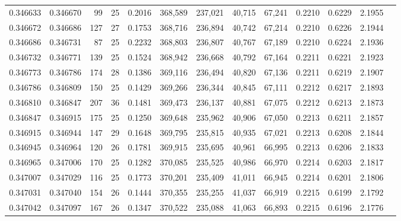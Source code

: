 \begin{tabular}{rrrrrrrrrrrrr}
0.346633 & 0.346670 &    99 &  25 &                                     0.2016 & 368,589 & 237,021 &  40,715 &  67,241 & 0.2210 & 0.6229 & 2.1955 \\
0.346672 & 0.346686 &   127 &  27 &                                     0.1753 & 368,716 & 236,894 &  40,742 &  67,214 & 0.2210 & 0.6226 & 2.1944 \\
0.346686 & 0.346731 &    87 &  25 &                                     0.2232 & 368,803 & 236,807 &  40,767 &  67,189 & 0.2210 & 0.6224 & 2.1936 \\
0.346732 & 0.346771 &   139 &  25 &                                     0.1524 & 368,942 & 236,668 &  40,792 &  67,164 & 0.2211 & 0.6221 & 2.1923 \\
0.346773 & 0.346786 &   174 &  28 &                                     0.1386 & 369,116 & 236,494 &  40,820 &  67,136 & 0.2211 & 0.6219 & 2.1907 \\
0.346786 & 0.346809 &   150 &  25 &                                     0.1429 & 369,266 & 236,344 &  40,845 &  67,111 & 0.2212 & 0.6217 & 2.1893 \\
0.346810 & 0.346847 &   207 &  36 &                                     0.1481 & 369,473 & 236,137 &  40,881 &  67,075 & 0.2212 & 0.6213 & 2.1873 \\
0.346847 & 0.346915 &   175 &  25 &                                     0.1250 & 369,648 & 235,962 &  40,906 &  67,050 & 0.2213 & 0.6211 & 2.1857 \\
0.346915 & 0.346944 &   147 &  29 &                                     0.1648 & 369,795 & 235,815 &  40,935 &  67,021 & 0.2213 & 0.6208 & 2.1844 \\
0.346945 & 0.346964 &   120 &  26 &                                     0.1781 & 369,915 & 235,695 &  40,961 &  66,995 & 0.2213 & 0.6206 & 2.1833 \\
0.346965 & 0.347006 &   170 &  25 &                                     0.1282 & 370,085 & 235,525 &  40,986 &  66,970 & 0.2214 & 0.6203 & 2.1817 \\
0.347007 & 0.347029 &   116 &  25 &                                     0.1773 & 370,201 & 235,409 &  41,011 &  66,945 & 0.2214 & 0.6201 & 2.1806 \\
0.347031 & 0.347040 &   154 &  26 &                                     0.1444 & 370,355 & 235,255 &  41,037 &  66,919 & 0.2215 & 0.6199 & 2.1792 \\
0.347042 & 0.347097 &   167 &  26 &                                     0.1347 & 370,522 & 235,088 &  41,063 &  66,893 & 0.2215 & 0.6196 & 2.1776 \\

\end{tabular}
